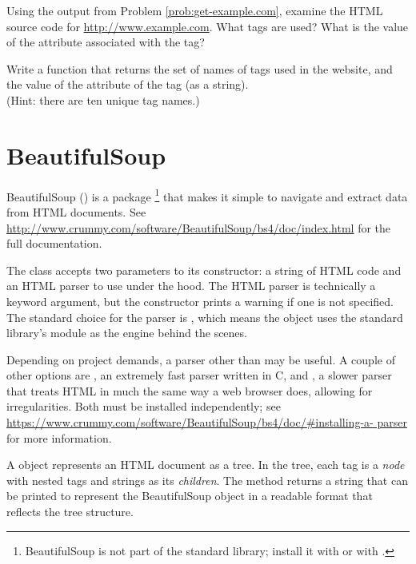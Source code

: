\begin{problem} %
Using the output from Problem \ref{prob:get-example.com}, examine the HTML source code for \url{http://www.example.com}.
What tags are used?
What is the value of the  attribute associated with the  tag?

Write a function that returns the set of names of tags used in the website, and the value of the  attribute of the  tag (as a string).
\\(Hint: there are ten unique tag names.)
\label{prob:look-at-example.com}
\end{problem}

\section*{BeautifulSoup} %

BeautifulSoup () is a package%
\footnote{BeautifulSoup is not part of the standard library; install it with  or with .} that makes it simple to navigate and extract data from HTML documents.
See \url{http://www.crummy.com/software/BeautifulSoup/bs4/doc/index.html} for the full documentation.

The  class accepts two parameters to its constructor: a string of HTML code and an HTML parser to use under the hood.
The HTML parser is technically a keyword argument, but the constructor prints a warning if one is not specified.
The standard choice for the parser is , which means the object uses the standard library's  module as the engine behind the scenes.

\begin{info}
Depending on project demands, a parser other than  may be useful.
A couple of other options are , an extremely fast parser written in C, and , a slower parser that treats HTML in much the same way a web browser does, allowing for irregularities.
Both must be installed independently; see \url{https://www.crummy.com/software/BeautifulSoup/bs4/doc/\#installing-a-	parser} for more information.
\end{info}

\vspace{5mm}
A  object represents an HTML document as a tree.
In the tree, each tag is a \emph{node} with nested tags and strings as its \emph{children}.
The  method returns a string that can be printed to represent the BeautifulSoup object in a readable format that reflects the tree structure.

